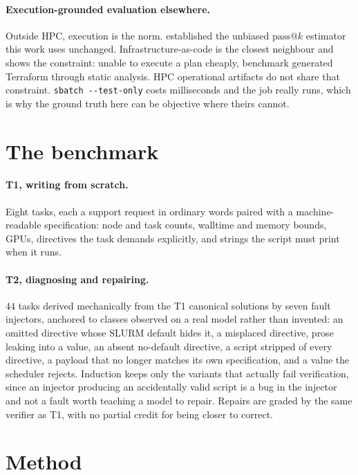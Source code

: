 \documentclass[11pt,a4paper]{article}
\begin{document}
\paragraph{Execution-grounded evaluation elsewhere.} Outside HPC, execution is the norm.
\citet{chen2021codex} established the unbiased $\mathrm{pass}@k$ estimator this work uses
unchanged. Infrastructure-as-code is the closest neighbour and shows the constraint: unable to
execute a plan cheaply, \citet{santos2026terraform} benchmark generated Terraform through static
analysis. HPC operational artifacts do not share that constraint. \texttt{sbatch -{}-test-only}
costs milliseconds and the job really runs, which is why the ground truth here can be objective
where theirs cannot.

\section{The benchmark}

\paragraph{T1, writing from scratch.} Eight tasks, each a support request in ordinary words paired
with a machine-readable specification: node and task counts, walltime and memory bounds, GPUs,
directives the task demands explicitly, and strings the script must print when it runs.

\paragraph{T2, diagnosing and repairing.} $44$ tasks derived mechanically from the T1 canonical
solutions by seven fault injectors, anchored to classes observed on a real model rather than
invented: an omitted directive whose SLURM default hides it, a misplaced directive, prose leaking
into a value, an absent no-default directive, a script stripped of every directive, a payload that
no longer matches its own specification, and a value the scheduler rejects. Induction keeps only
the variants that actually fail verification, since an injector producing an accidentally valid
script is a bug in the injector and not a fault worth teaching a model to repair. Repairs are
graded by the same verifier as T1, with no partial credit for being closer to correct.

\section{Method}
\end{document}
